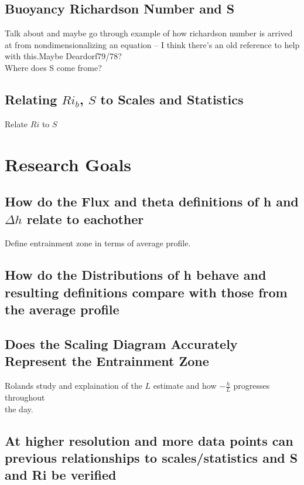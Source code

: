 \subsection{Buoyancy Richardson Number and S}

Talk about and maybe go through example of how richardson number is arrived at from nondimensionalizing an equation -- I think there's an old reference to help with this.Maybe Deardorf79/78?\\

Where does S come frome?

\subsection{Relating $Ri_{b}$, $S$ to Scales and Statistics}
Relate $Ri$ to $S$\\

\section{Research Goals}
\label{sec:ResearchGoals}

\subsection{How do the Flux and theta definitions of h and $\Delta h$ relate to eachother}

Define entrainment zone in terms of average profile.\\

\subsection{How do the Distributions of h behave and resulting definitions compare with those from the average profile}

\subsection{Does the Scaling Diagram Accurately Represent the Entrainment Zone}

Rolands study and explaination of the $L$ estimate and how $-\frac{h}{L}$ progresses throughout\\
the day.\\

\subsection{At higher resolution and more data points can previous relationships to scales/statistics and S and Ri be verified}



